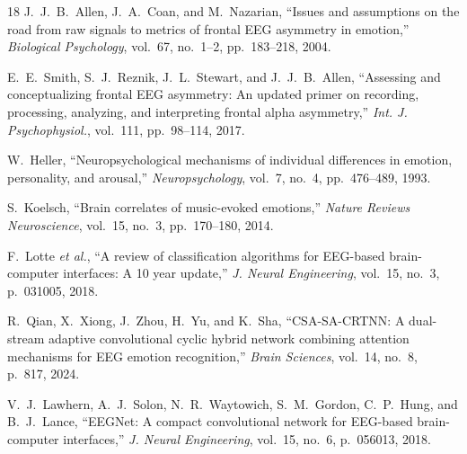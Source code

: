\documentclass[a4paper, 10pt, conference]{ieeeconf}
\begin{document}
\begin{thebibliography}{18}
\nopagebreak
J.~J.~B.~Allen, J.~A.~Coan, and M.~Nazarian, ``Issues and assumptions on the road from raw signals to metrics of frontal EEG asymmetry in emotion,'' \emph{Biological Psychology}, vol.~67, no.~1--2, pp.~183--218, 2004.

E.~E.~Smith, S.~J.~Reznik, J.~L.~Stewart, and J.~J.~B.~Allen, ``Assessing and conceptualizing frontal EEG asymmetry: An updated primer on recording, processing, analyzing, and interpreting frontal alpha asymmetry,'' \emph{Int. J. Psychophysiol.}, vol.~111, pp.~98--114, 2017.

W.~Heller, ``Neuropsychological mechanisms of individual differences in emotion, personality, and arousal,'' \emph{Neuropsychology}, vol.~7, no.~4, pp.~476--489, 1993.

S.~Koelsch, ``Brain correlates of music-evoked emotions,'' \emph{Nature Reviews Neuroscience}, vol.~15, no.~3, pp.~170--180, 2014.

F.~Lotte \emph{et al.}, ``A review of classification algorithms for EEG-based brain-computer interfaces: A 10 year update,'' \emph{J. Neural Engineering}, vol.~15, no.~3, p.~031005, 2018.

R.~Qian, X.~Xiong, J.~Zhou, H.~Yu, and K.~Sha, ``CSA-SA-CRTNN: A dual-stream adaptive convolutional cyclic hybrid network combining attention mechanisms for EEG emotion recognition,'' \emph{Brain Sciences}, vol.~14, no.~8, p.~817, 2024.

V.~J.~Lawhern, A.~J.~Solon, N.~R.~Waytowich, S.~M.~Gordon, C.~P.~Hung, and B.~J.~Lance, ``EEGNet: A compact convolutional network for EEG-based brain-computer interfaces,'' \emph{J. Neural Engineering}, vol.~15, no.~6, p.~056013, 2018.

\end{thebibliography}
\end{document}
